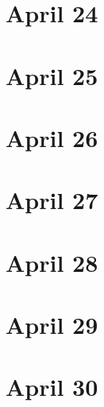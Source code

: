\section{April 24}

\section{April 25}

\section{April 26}

\section{April 27}

\section{April 28}

\section{April 29}

\section{April 30}

